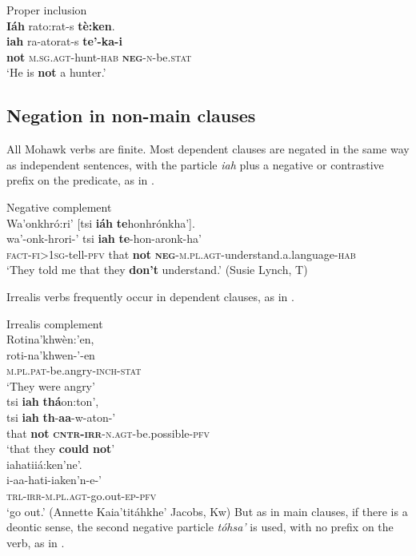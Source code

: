 \documentclass[output=paper,colorlinks,citecolor=brown]{langscibook}
\begin{document}
\ea\label{ex:moh:56}Proper inclusion\\
    \glll \textbf{Iáh} rato:rat-s \textbf{tè:ken}.\\
         \textbf{iah} ra-atorat-s \textbf{te’-ka-i}\\ 
         \textbf{not} \textsc{m.sg.agt}-hunt-\textsc{hab} \textsc{\textbf{neg}-n-}be.\textsc{stat}\\
    \glt ‘He is \textbf{not} a hunter.’\\ 
\z

\subsection{Negation in non-main clauses}\label{sec:moh:2.4}

All Mohawk verbs are finite. Most dependent clauses are negated in the same way as independent sentences, with the particle \textit{iah} plus a negative or contrastive prefix on the predicate, as in .

\ea\label{ex:moh:57}Negative complement\\
    \glll Wa’onkhró:ri’ [tsi \textbf{iáh} \textbf{te}honhrónkha’].\\
         wa’-onk-hrori-’ tsi \textbf{iah} \textbf{te}-hon-aronk-ha’ \\
         \textsc{fact-fi>1sg}-tell-\textsc{pfv} that \textbf{not} \textsc{\textbf{neg}-m.pl.agt}-understand.a.language-\textsc{hab}\\ 
    \glt ‘They told me that they \textbf{don’t} understand.’ (Susie Lynch, T) 
\z

Irrealis verbs frequently occur in dependent clauses, as in .

\ea\label{ex:moh:58}Irrealis complement\\
    \glll Rotina’khwèn:’en, \\ 
         roti-na’khwen-’-en \\ 
         \textsc{m.pl.pat}-be.angry-\textsc{inch-stat} \\
    \glt ‘They were angry’\\ \medskip 
    \glll tsi \textbf{iah} \textbf{thá}on:ton’, \\ 
          tsi \textbf{iah} \textbf{th}-\textbf{aa}-w-aton-’ \\
          that \textbf{not} \textbf{\textsc{cntr-irr}}-\textsc{n.agt}-be.possible-\textsc{pfv} \\
    \glt ‘that they \textbf{could} \textbf{not}’\\ \medskip
    \glll   iahatiiá:ken’ne’. \\ 
           i-aa-hati-iaken’n-e-’ \\
           \textsc{trl-irr-m.pl.agt}-go.out-\textsc{ep-pfv}\\
    \glt   ‘go out.’ (Annette Kaia’titáhkhe’ Jacobs, Kw)
\z 
But as in main clauses, if there is a deontic sense, the second negative particle \textit{tóhsa’} is used, with no prefix on the verb, as in .
\end{document}
